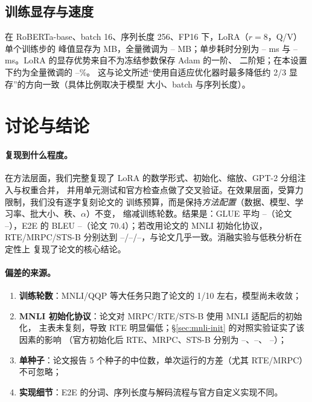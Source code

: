 \documentclass[11pt,a4paper]{ctexart}
\providecommand{\GlueOursAvg}{--}\providecommand{\GluePaperAvg}{--}\providecommand{\GlueGap}{--}
\providecommand{\EtwoLoraBleu}{--}\providecommand{\EtwoLoraRouge}{--}\providecommand{\EtwoLoraCider}{--}
\providecommand{\FtPeakMem}{--}\providecommand{\LoraStepMs}{--}\providecommand{\FtStepMs}{--}
\providecommand{\LoraMemPct}{--}\providecommand{\OfficialM}{--}\providecommand{\OfficialMM}{--}
\providecommand{\InitMrpcOff}{--}\providecommand{\InitRteOff}{--}\providecommand{\InitStsbOff}{--}
\begin{document}
\begin{table}[H]
\centering
\caption{RoBERTa-base 单次前向时延（每个设置交替测量 5 轮、每轮 20 次前向，取中位数）。}
\label{tab:efficiency}
\small

\end{table}

\subsection{训练显存与速度}
在 RoBERTa-base、batch 16、序列长度 256、FP16 下，LoRA（$r=8$，Q/V）单个训练步的
峰值显存为 \LoraPeakMem{} MB，全量微调为 \FtPeakMem{} MB；单步耗时分别为
\LoraStepMs{} ms 与 \FtStepMs{} ms。LoRA 的显存优势来自不为冻结参数保存 Adam 的一阶、
二阶矩；在本设置下约为全量微调的 \LoraMemPct\%。
这与论文所述“使用自适应优化器时最多降低约 2/3 显存”的方向一致（具体比例取决于模型
大小、batch 与序列长度）。

\section{讨论与结论}
\label{sec:conclusion}

\paragraph{复现到什么程度。}
在方法层面，我们完整复现了 LoRA 的数学形式、初始化、缩放、GPT-2 分组注入与权重合并，
并用单元测试和官方检查点做了交叉验证。在效果层面，受算力限制，我们没有逐字复刻论文的
训练预算，而是保持\emph{方法配置}（数据、模型、学习率、批大小、秩、$\alpha$）不变，
缩减训练轮数。结果是：GLUE 平均 \GlueOursAvg{}（论文 \GluePaperAvg{}），E2E 的 BLEU
\EtwoLoraBleu{}（论文 70.4）；若改用论文的 MNLI 初始化协议，RTE/MRPC/STS-B 分别达到
\InitRteOff{}/\InitMrpcOff{}/\InitStsbOff{}，与论文几乎一致。消融实验与低秩分析在定性上
复现了论文的核心结论。

\paragraph{偏差的来源。}
\begin{enumerate}
  \item \textbf{训练轮数}：MNLI/QQP 等大任务只跑了论文的 1/10 左右，模型尚未收敛；
  \item \textbf{MNLI 初始化协议}：论文对 MRPC/RTE/STS-B 使用 MNLI 适配后的初始化，
        主表未复刻，导致 RTE 明显偏低；\S\ref{sec:mnli-init} 的对照实验证实了该因素的影响
        （官方初始化后 RTE、MRPC、STS-B 分别为 \InitRteOff{}、\InitMrpcOff{}、
        \InitStsbOff{}）；
  \item \textbf{单种子}：论文报告 5 个种子的中位数，单次运行的方差（尤其 RTE/MRPC）不可忽略；
  \item \textbf{实现细节}：E2E 的分词、序列长度与解码流程与官方自定义实现不同。
\end{enumerate}
\end{document}
